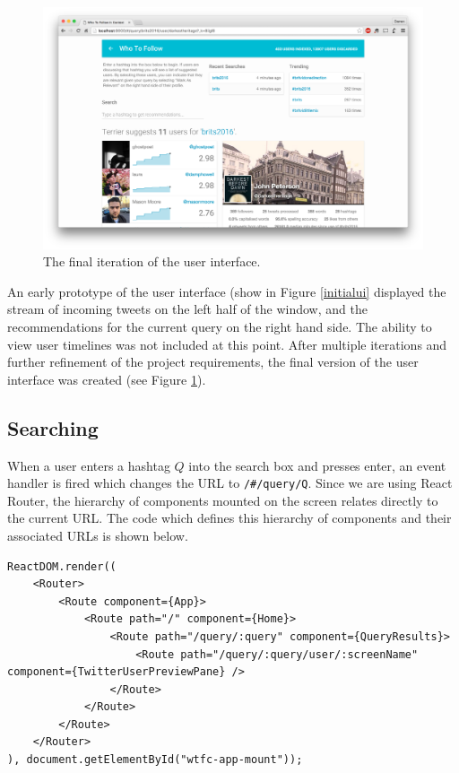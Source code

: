 \documentclass{l4proj}
\newcommand{\code}[1]{\texttt{#1}}
\begin{document}
        
\begin{figure}
\centering
\includegraphics[scale=0.17]{finalscreenshot.png}
\caption{The final iteration of the user interface.}
\label{finalscreenshot}
\end{figure} 
        
        An early prototype of the user interface (show in Figure \ref{initialui} displayed the stream of incoming tweets on the left half of the window, and the recommendations for the current query on the right hand side. The ability to view user timelines was not included at this point. After multiple iterations and further refinement of the project requirements, the final version of the user interface was created (see Figure \ref{finalscreenshot}).
        
        
        \subsection{Searching}
        When a user enters a hashtag $Q$ into the search box and presses enter, an event handler is fired which changes the URL to \code{/\#/query/Q}. Since we are using React Router, the hierarchy of components mounted on the screen relates directly to the current URL. The code which defines this hierarchy of components and their associated URLs is shown below.
        
\begin{lstlisting}[caption=Definition of the hierarchy of React component and how they map to the URL.]
ReactDOM.render((
    <Router>
        <Route component={App}>
            <Route path="/" component={Home}>
                <Route path="/query/:query" component={QueryResults}>
                    <Route path="/query/:query/user/:screenName" component={TwitterUserPreviewPane} />
                </Route>
            </Route>
        </Route>
    </Router>
), document.getElementById("wtfc-app-mount"));
\end{lstlisting}
         
\end{document}
